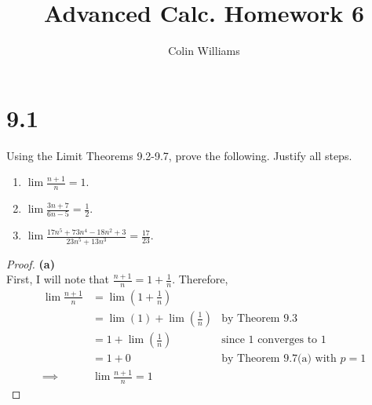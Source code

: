 \documentclass[10pt,a4paper]{article}
\title{Advanced Calc. Homework 6}
\author{Colin Williams}
\theoremstyle{definition}
\begin{document}
\maketitle

\section*{9.1}
Using the Limit Theorems 9.2-9.7, prove the following. Justify all steps.
\begin{enumerate}[label = (\alph*)]
\item $\displaystyle \lim \frac{n + 1}{n} = 1$.
\item $\displaystyle \lim \frac{3n + 7}{6n - 5} = \frac{1}{2}$.
\item $\displaystyle \lim \frac{17n^5 + 73n^4 - 18n^2 + 3}{23n^5 + 13n^3} = \frac{17}{23}$.
\end{enumerate}

\begin{proof}{\textbf{(a)}}
\\First, I will note that $\displaystyle \frac{n + 1}{n} = 1 + \frac{1}{n}$. Therefore,
\begin{align*}
\lim \frac{n + 1}{n} &= \lim\left(1 + \frac{1}{n}\right)\\
&= \lim(1) + \lim\left(\frac{1}{n}\right) &\text{by Theorem 9.3}\\
&= 1 + \lim\left(\frac{1}{n}\right) &\text{since 1 converges to 1}\\
&= 1 + 0 &\text{by Theorem 9.7(a) with }p = 1\\
\implies &\boxed{\lim \frac{n + 1}{n} = 1}
\end{align*}
\end{proof}
\end{document}
